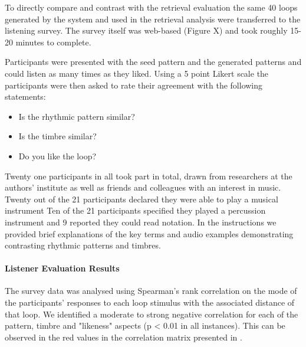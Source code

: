 To directly compare and contrast with the retrieval evaluation the same 40 loops generated by the system and used in the retrieval analysis were transferred to the listening survey. The survey itself was web-based (Figure X) and took roughly 15-20 minutes to complete.

Participants were presented with the seed pattern and the generated patterns and could listen as many times as they liked. Using a 5 point Likert scale the participants were then asked to rate their agreement with the following statements:

\begin{itemize}
  \item Is the rhythmic pattern similar?
  \item Is the timbre similar?
  \item Do you like the loop?
\end{itemize}

Twenty one participants in all took part in total, drawn from researchers at the authors' institute as well as friends and colleagues with an interest in music. Twenty out of the 21 participants declared they were able to play a musical instrument  Ten of the 21 participants specified they played a percussion instrument and 9 reported they could read notation. In the instructions we provided brief explanations of the key terms and audio examples demonstrating contrasting rhythmic patterns and timbres.

\paragraph{Listener Evaluation Results}

The survey data was analysed using Spearman's rank correlation on the mode of the participants' responses to each loop stimulus with the associated distance of that loop. We identified a moderate to strong negative correlation for each of the pattern, timbre and "likeness" aspects (p < 0.01 in all instances). This can be observed in the red values in the correlation matrix presented in .

